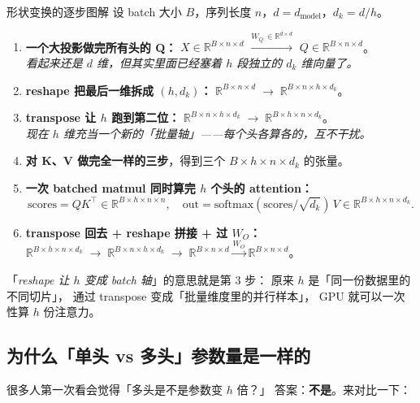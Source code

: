 \documentclass[11pt,a4paper]{ctexart}
\newcommand{\R}{\mathbb{R}}
\newcommand{\softmax}{\mathrm{softmax}}
\begin{document}
\begin{mathbox}{形状变换的逐步图解}
设 batch 大小 $B$，序列长度 $n$，$d = d_{\text{model}}$，$d_k = d/h$。

\begin{enumerate}
  \item \textbf{一个大投影做完所有头的 Q：}
        $X \in \R^{B \times n \times d}$
        $\xrightarrow{W_Q\, \in \R^{d \times d}}$
        $Q \in \R^{B \times n \times d}$。\\
        \emph{看起来还是 $d$ 维，但其实里面已经塞着 $h$ 段独立的 $d_k$ 维向量了。}
  \item \textbf{reshape 把最后一维拆成 $(h, d_k)$：}
        $\R^{B \times n \times d} \;\to\; \R^{B \times n \times h \times d_k}$。
  \item \textbf{transpose 让 $h$ 跑到第二位：}
        $\R^{B \times n \times h \times d_k} \;\to\; \R^{B \times h \times n \times d_k}$。\\
        \emph{现在 $h$ 维充当一个新的「批量轴」——每个头各算各的，互不干扰。}
  \item \textbf{对 K、V 做完全一样的三步}，得到三个 $B \times h \times n \times d_k$ 的张量。
  \item \textbf{一次 batched matmul 同时算完 $h$ 个头的 attention：}
        \[
          \mathrm{scores} = Q K^\top \in \R^{B \times h \times n \times n},\quad
          \mathrm{out} = \softmax(\mathrm{scores}/\sqrt{d_k})\,V
          \in \R^{B \times h \times n \times d_k}.
        \]
  \item \textbf{transpose 回去 + reshape 拼接 + 过 $W_O$：}
        $\R^{B \times h \times n \times d_k}
        \;\to\; \R^{B \times n \times h \times d_k}
        \;\to\; \R^{B \times n \times d}
        \xrightarrow{W_O} \R^{B \times n \times d}$。
\end{enumerate}
\end{mathbox}

「\emph{reshape 让 $h$ 变成 batch 轴}」的意思就是第 3 步：
原来 $h$ 是「同一份数据里的不同切片」，
通过 transpose 变成「批量维度里的并行样本」，
GPU 就可以一次性算 $h$ 份注意力。

\subsection{为什么「单头 vs 多头」参数量是一样的}

很多人第一次看会觉得「多头是不是参数变 $h$ 倍？」
答案：\textbf{不是}。来对比一下：
\end{document}
